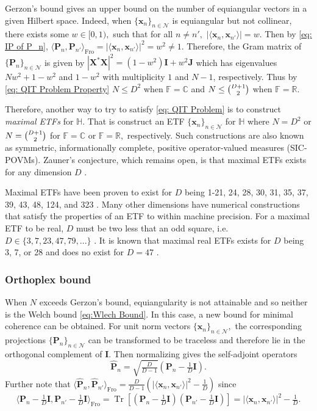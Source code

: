 \documentclass[3p,11pt]{elsarticle}
\newcommand{\bbC}{\mathbb{C}}
\newcommand{\bbF}{\mathbb{F}}
\newcommand{\bbH}{\mathbb{H}}
\newcommand{\bbR}{\mathbb{R}}
\newcommand{\bfI}{\mathbf{I}}
\newcommand{\bfJ}{\mathbf{J}}
\newcommand{\bfP}{\mathbf{P}}
\newcommand{\bfx}{\mathbf{x}}
\newcommand{\bfX}{\mathbf{X}}
\newcommand{\calN}{\mathcal{N}}
\newcommand{\Tr}{\operatorname{Tr}}
\newcommand{\Fro}{\mathrm{Fro}}
\newcommand{\abs}[1]{|{#1}|}
\newcommand{\ip}[2]{\langle{#1},{#2}\rangle}
\theoremstyle{definition}
\begin{document}
Gerzon's bound gives an upper bound on the number of equiangular vectors in a given Hilbert space. Indeed, when $\{\bfx_n\}_{n\in\calN}$ is equiangular but not collinear, there exists some $w\in[0,1),$ such that for all $n\not=n',$ $\abs{\ip{\bfx_n}{\bfx_{n'}}}=w.$ Then by \eqref{eq: IP of P_n}, $\ip{\bfP_n}{\bfP_{n'}}_\Fro=\abs{\ip{\bfx_n}{\bfx_{n'}}}^2=w^2\not=1.$ Therefore, the Gram matrix of $\{\bfP_n\}_{n\in\calN}$ is given by $\abs{\bfX^*\bfX}^2=(1-w^2)\bfI+w^2\bfJ$ which has eigenvalues $Nw^2+1-w^2$ and $1-w^2$ with multiplicity $1$ and $N-1$, respectively. Thus by \eqref{eq: QIT Problem Property} $N\leq D^2$ when $\bbF=\bbC$ and $N\leq\smash{\binom{D+1}{2}}$ when $\bbF=\bbR.$ 

Therefore, another way to try to satisfy \eqref{eq: QIT Problem} is to construct \textit{maximal ETFs} for $\bbH.$ That is construct an ETF $\{\bfx_n\}_{n\in\calN}$ for $\bbH$ where $N=D^2$ or $N=\tbinom{D+1}{2}$ for $\bbF=\bbC$ or $\bbF=\bbR,$ respectively. Such constructions are also known as symmetric, informationally complete, positive operator-valued measures (SIC-POVMs). Zauner's conjecture, which remains open, is that maximal ETFs exists for any dimension $D$ \cite{Zauner99}. 

Maximal ETFs have been proven to exist for $D$ being 1-21, 24, 28, 30, 31, 35, 37, 39, 43, 48, 124, and 323 \cite{Knopp}. Many other dimensions have numerical constructions that satisfy the properties of an ETF to within machine precision. For a maximal ETF to be real, $D$ must be two less that an odd square, i.e. $D\in\{3,7,23,47,79,...\}$ \cite{FickusM16}. It is known that maximal real ETFs exists for $D$ being  3, 7, or 28 and does no exist for $D=47$ \cite{BannaiMV05, FickusM16}.

\subsubsection{Orthoplex bound}
When $N$ exceeds Gerzon's bound, equiangularity is not attainable and so neither is the Welch bound \eqref{eq:Wlech Bound}. In this case, a new bound for minimal coherence can be obtained. For unit norm vectors $\{\bfx_n\}_{n\in\calN},$ the corresponding projections $\{\bfP_n\}_{n\in\calN}$ can be transformed to be traceless and therefore lie in the orthogonal complement of $\bfI.$ Then normalizing gives the self-adjoint operators
\begin{equation}
    \label{eq:Lifted operators}
    \hat{\bfP}_n=\sqrt{\tfrac{D}{D-1}}(\bfP_n-\tfrac{1}{D}\bfI).
\end{equation} 
Further note that $\ip{\hat{\bfP}_n}{\hat{\bfP}_{n'}}_\Fro=\tfrac{D}{D-1}\left(\abs{\ip{\bfx_n}{\bfx_{n'}}}^2-\tfrac{1}{D}\right)$ since 
\begin{equation}
\label{eq: Unnormalized lifting inner products}
    \ip{\bfP_n-\tfrac{1}{D}\bfI}{\bfP_{n'}-\tfrac{1}{D}\bfI}_\Fro=\Tr\left[(\bfP_n-\tfrac{1}{D}\bfI)(\bfP_{n'}-\tfrac{1}{D}\bfI)\right]=\abs{\ip{\bfx_n}{\bfx_{n'}}}^2-\tfrac{1}{D}.
\end{equation} 
\end{document}
